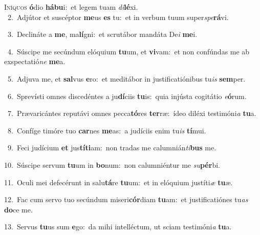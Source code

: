 \lettrine{\initial\textcolor{\initialcolor}{I}}{níquos} \textbf{ó}\-dio \textbf{há}\-\textbf{bu}i:~\star et legem tuam \textit{di}\-\textbf{lé}xi.\\
{\numbfont\textcolor{\numbcolor}{~2.}}~Adjútor et suscéptor \textbf{me}\-us \textbf{es} tu:~\star et in verbum tuum super\-\textit{spe}\-\textbf{rá}vi.\par
{\numbfont\textcolor{\numbcolor}{~3.}}~Declináte a \textbf{me}\-, ma\-\textbf{lí}\-gni:~\star et scrutábor mandáta De\textit{i} \textbf{me}\-i.\par
{\numbfont\textcolor{\numbcolor}{~4.}}~Súscipe me secúndum elóquium \textbf{tu}\-um, et \textbf{vi}\-vam:~\star et non confúndas me ab exspectatió\textit{ne} \textbf{me}\-a.\par
{\numbfont\textcolor{\numbcolor}{~5.}}~Adjuva me, et \textbf{sal}\-vus \textbf{e}\-ro:~\star et meditábor in justificatiónibus tu\textit{is} \textbf{sem}\-per.\par
{\numbfont\textcolor{\numbcolor}{~6.}}~Sprevísti omnes discedéntes a ju\-\textbf{dí}\-ciis \textbf{tu}\-is:~\star quia injústa cogitátio \textit{e}\-\textbf{ó}rum.\par
{\numbfont\textcolor{\numbcolor}{~7.}}~Prævaricántes reputávi omnes pecca\-\textbf{tó}\-res \textbf{ter}\-ræ:~\star ídeo diléxi testimóni\textit{a} \textbf{tu}\-a.\par
{\numbfont\textcolor{\numbcolor}{~8.}}~Confíge timóre tuo \textbf{car}\-nes \textbf{me}\-as:~\star a judíciis enim tu\textit{is} \textbf{tí}\-mui.\par
{\numbfont\textcolor{\numbcolor}{~9.}}~Feci judícium \textbf{et} jus\-\textbf{tí}\-\textbf{ti}am:~\star non tradas me calumnián\-\textit{ti}\-\textbf{bus} me.\par
{\numbfont\textcolor{\numbcolor}{10.}}~Súscipe servum \textbf{tu}\-um in \textbf{bo}\-num:~\star non calumniéntur me \textit{su}\-\textbf{pér}bi.\par
{\numbfont\textcolor{\numbcolor}{11.}}~Oculi mei defecérunt in salu\-\textbf{tá}\-re \textbf{tu}\-um:~\star et in elóquium justíti\textit{æ} \textbf{tu}\-æ.\par
{\numbfont\textcolor{\numbcolor}{12.}}~Fac cum servo tuo secúndum miseri\-\textbf{cór}\-diam \textbf{tu}\-am:~\star et justificatiónes tu\textit{as} \textbf{do}\-ce me.\par
{\numbfont\textcolor{\numbcolor}{13.}}~Servus \textbf{tu}\-us sum \textbf{e}\-go:~\star da mihi intelléctum, ut sciam testimóni\textit{a} \textbf{tu}\-a.\par

